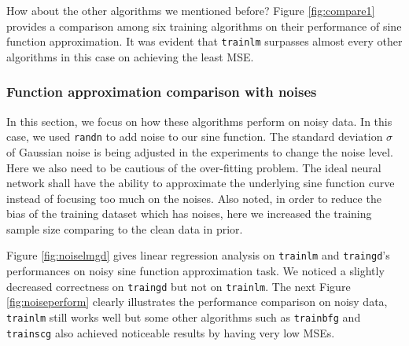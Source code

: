 \documentclass{article}
\begin{document}
How about the other algorithms we mentioned before? Figure \ref{fig:compare1} provides a comparison among six training algorithms on their performance of sine function approximation. It was evident that \verb|trainlm| surpasses almost every other algorithms in this case on achieving the least MSE.


\subsubsection{Function approximation comparison with noises}

In this section, we focus on how these algorithms perform on noisy data. In this case, we used \verb|randn| to add noise to our sine function. The standard deviation $\sigma$ of Gaussian noise is being adjusted in the experiments to change the noise level. Here we also need to be cautious of the over-fitting problem. The ideal neural network shall have the ability to approximate the underlying sine function curve instead of focusing too much on the noises. Also noted, in order to reduce the bias of the training dataset which has noises, here we increased the training sample size comparing to the clean data in prior.

Figure \ref{fig:noiselmgd} gives linear regression analysis on \verb|trainlm| and \verb|traingd|'s performances on noisy sine function approximation task. We noticed a slightly decreased correctness on \verb|traingd| but not on \verb|trainlm|. The next Figure \ref{fig:noiseperform} clearly illustrates the performance comparison on noisy data, \verb|trainlm| still works well but some other algorithms such as \verb|trainbfg| and \verb|trainscg| also achieved noticeable results by having very low MSEs.
\end{document}
